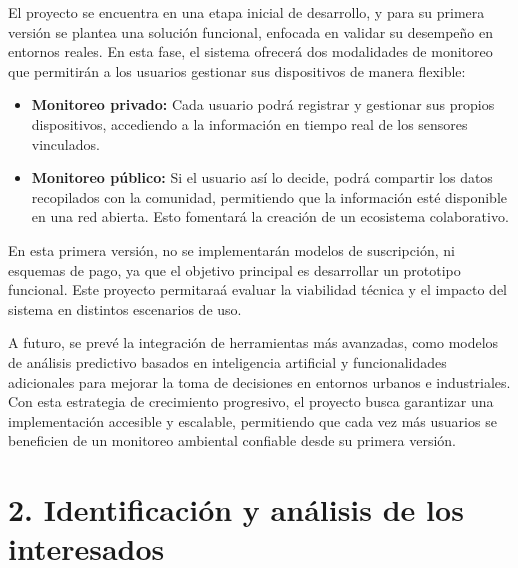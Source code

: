 \documentclass[
11pt, %
]{charter}
\begin{document}
El proyecto se encuentra en una etapa inicial de desarrollo, y para su primera versión se plantea una solución funcional, enfocada en validar su desempeño en entornos reales. En esta fase, el sistema ofrecerá dos modalidades de monitoreo que permitirán a los usuarios gestionar sus dispositivos de manera flexible:  

\begin{itemize}
    \item \textbf{Monitoreo privado:} Cada usuario podrá registrar y gestionar sus propios dispositivos, accediendo a la información en tiempo real de los sensores vinculados.  
    \item \textbf{Monitoreo público:} Si el usuario así lo decide, podrá compartir los datos recopilados con la comunidad, permitiendo que la información esté disponible en una red abierta. Esto fomentará la creación de un ecosistema colaborativo.  
\end{itemize}

En esta primera versión, no se implementarán modelos de suscripción, ni esquemas de pago, ya que el objetivo principal es desarrollar un prototipo funcional. Este proyecto permitaraá evaluar la viabilidad técnica y el impacto del sistema en distintos escenarios de uso.  

A futuro, se prevé la integración de herramientas más avanzadas, como modelos de análisis predictivo basados en inteligencia artificial y funcionalidades adicionales para mejorar la toma de decisiones en entornos urbanos e industriales. Con esta estrategia de crecimiento progresivo, el proyecto busca garantizar una implementación accesible y escalable, permitiendo que cada vez más usuarios se beneficien de un monitoreo ambiental confiable desde su primera versión.



\vspace{25px}


\section{2. Identificación y análisis de los interesados}
\label{sec:interesados}
\end{document}

